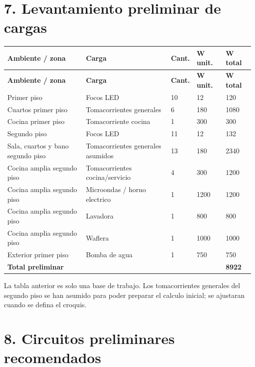 \documentclass[12pt,a4paper]{article}
\begin{document}
\section*{7. Levantamiento preliminar de cargas}

\begin{longtable}{L{4.2cm}L{4.2cm}R{1.6cm}R{2.2cm}R{2.2cm}}
\toprule
\textbf{Ambiente / zona} & \textbf{Carga} & \textbf{Cant.} & \textbf{W unit.} & \textbf{W total} \\
\midrule
\endfirsthead
\toprule
\textbf{Ambiente / zona} & \textbf{Carga} & \textbf{Cant.} & \textbf{W unit.} & \textbf{W total} \\
\midrule
\endhead
Primer piso & Focos LED & 10 & 12 & 120 \\
Cuartos primer piso & Tomacorrientes generales & 6 & 180 & 1080 \\
Cocina primer piso & Tomacorriente cocina & 1 & 300 & 300 \\
Segundo piso & Focos LED & 11 & 12 & 132 \\
Sala, cuartos y bano segundo piso & Tomacorrientes generales asumidos & 13 & 180 & 2340 \\
Cocina amplia segundo piso & Tomacorrientes cocina/servicio & 4 & 300 & 1200 \\
Cocina amplia segundo piso & Microondas / horno electrico & 1 & 1200 & 1200 \\
Cocina amplia segundo piso & Lavadora & 1 & 800 & 800 \\
Cocina amplia segundo piso & Waflera & 1 & 1000 & 1000 \\
Exterior primer piso & Bomba de agua & 1 & 750 & 750 \\
\midrule
\textbf{Total preliminar} &  &  &  & \textbf{8922} \\
\bottomrule
\end{longtable}

La tabla anterior es solo una base de trabajo. Los tomacorrientes generales del segundo piso se han asumido para poder preparar el calculo inicial; se ajustaran cuando se defina el croquis.

\section*{8. Circuitos preliminares recomendados}
\end{document}
